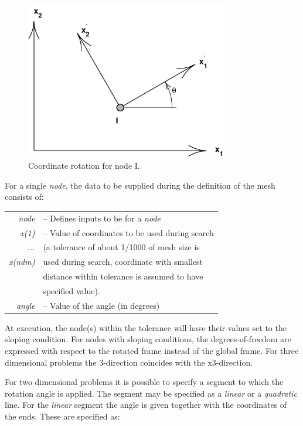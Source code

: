 \begin{figure}[hb!]
\begin{center}
\includegraphics[width=3.5in]{../lmesh/angcor}
\caption{Coordinate rotation for node I.  \label{cang1} }
\end{center}
\end{figure}

For a single {\it node}, the data to be supplied during
the definition of the mesh consists of:

\begin{center}
\begin{tabular}{r l}
\it node   &-- Defines inputs to be for a {\it node} \\
\it x(1)   &-- Value of coordinates to be used during search \\
\it ...    &\quad (a tolerance of about 1/1000 of mesh size is \\
\it x(ndm) &\quad used during search, coordinate with smallest \\
           &\quad distance within tolerance is assumed to have \\
           &\quad specified value). \\
\it angle  &-- Value of the angle (in degrees) \\
\end{tabular}
\end{center}
At execution, the node(s) within the tolerance will have
their values set to the sloping condition.  For nodes with
sloping conditions, the degrees-of-freedom are expressed
with respect to the rotated frame instead of the global
frame.  For three dimensional problems the 3-direction
coincides with the x3-direction.

For two dimensional problems it is possible to
specify a segment to which the rotation angle is
applied.  The segment may be specified as a {\it linear}
or a {\it quadratic} line. For the {\it linear} segment the angle
is given together with the coordinates of the ends.
These are specified as:

